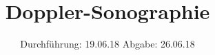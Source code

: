 

\subject{US3}
\title{Doppler-Sonographie}
\date{
  Durchführung: 19.06.18
  \hspace{3em}
  Abgabe: 26.06.18
}



\maketitle
\thispagestyle{empty}
\tableofcontents
\newpage








\newpage
\printbibliography


